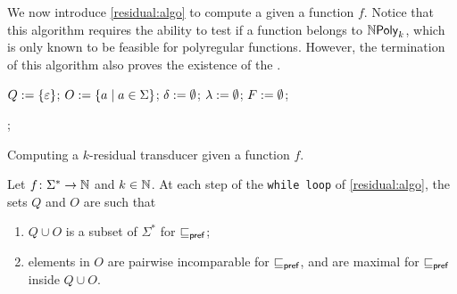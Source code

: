 We now introduce \cref{residual:algo} to compute a 
given a function $f$. Notice that this algorithm requires the ability to test
if a function belongs to $\NPoly[k]$, which is only known to be feasible for
 polyregular functions. However, the termination of this
algorithm also proves the existence of the .


\begin{algorithm}
    $Q \mathrel{:=} \{ \varepsilon \}$;
    $O \mathrel{:=} \mathopen{\{}  a  \mid  a \in \Sigma \mathclose{\}}$;
    $\delta \mathrel{:=} \emptyset$;
    $\lambda \mathrel{:=} \emptyset$;
    $F \mathrel{:=} \emptyset$;

    ;
    \caption{Computing a $k$-residual transducer given a function $f$.}
    \label{residual:algo}
\end{algorithm}

\begin{fact}
    \label{q-o-prefix-cool:fact}
    Let $f \colon \Sigma^* \to \mathbb{N}$ and $k \in \mathbb{N}$.
    At each step of the \texttt{while loop}
    of \cref{residual:algo}, the sets
    $Q$ and $O$ are such that
    \begin{enumerate}
        \item $Q \cup O$ is a  subset of 
            $\Sigma^*$ for $\sqsubseteq_{\mathsf{pref}}$;
        \item elements in $O$ are pairwise incomparable
            for $\sqsubseteq_{\mathsf{pref}}$, and are maximal
            for $\sqsubseteq_{\mathsf{pref}}$ inside $Q \cup O$.
    \end{enumerate}
\end{fact}

